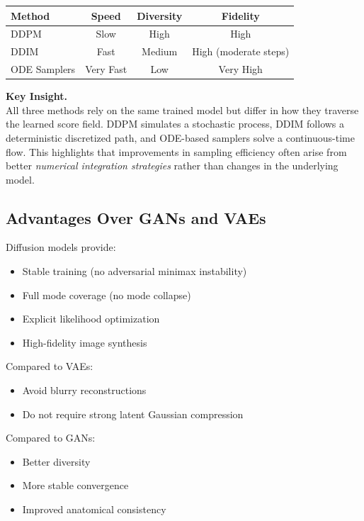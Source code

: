 \begin{center}
\begin{tabular}{lccc}
\toprule
Method & Speed & Diversity & Fidelity \\
\midrule
DDPM & Slow & High & High \\
DDIM & Fast & Medium & High (moderate steps) \\
ODE Samplers & Very Fast & Low & Very High \\
\bottomrule
\end{tabular}
\end{center}

\vspace{0.5em}
\noindent
\textbf{Key Insight.} \\
All three methods rely on the same trained model but differ in how they traverse the learned score field. DDPM simulates a stochastic process, DDIM follows a deterministic discretized path, and ODE-based samplers solve a continuous-time flow. This highlights that improvements in sampling efficiency often arise from better \textit{numerical integration strategies} rather than changes in the underlying model.

\subsection{Advantages Over GANs and VAEs}

Diffusion models provide:

\begin{itemize}
    \item Stable training (no adversarial minimax instability)
    \item Full mode coverage (no mode collapse)
    \item Explicit likelihood optimization
    \item High-fidelity image synthesis
\end{itemize}

Compared to VAEs:
\begin{itemize}
    \item Avoid blurry reconstructions
    \item Do not require strong latent Gaussian compression
\end{itemize}

Compared to GANs:
\begin{itemize}
    \item Better diversity
    \item More stable convergence
    \item Improved anatomical consistency
\end{itemize}

